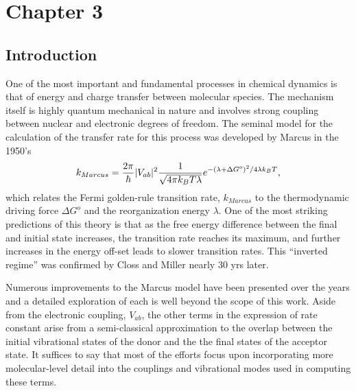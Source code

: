 \chapter{Chapter 3}

\section{Introduction}

One of the most important and fundamental processes in chemical  dynamics is
that of energy and charge transfer between molecular species.  The mechanism
itself is highly quantum mechanical in nature and involves strong coupling between nuclear and
electronic degrees of freedom.  The seminal model for the calculation of the transfer rate for this process
was developed by Marcus in the 1950's\cite{marcus1956theory,marcus1965theory,marcus1993electron}
\begin{equation}
k_{Marcus}=\frac{2\pi}{\hbar}|V_{ab}|^{2}\frac{1}{\sqrt{4\text{\ensuremath{\pi}}k_{B}T\lambda}}e^{-(\lambda+ \Delta G^{o})^{2}/4\text{\ensuremath{\lambda}}k_{B}T},
\end{equation}
which relates the Fermi golden-rule transition rate, $k_{Marcus}$
to the thermodynamic driving force $\Delta G^{o}$ and the reorganization energy $\lambda$.
One of the most striking predictions of this theory is that as the free energy difference between the final and initial state increases, the transition rate reaches its maximum,
and further increases in the energy off-set leads to slower transition rates.
This ``inverted regime''  was confirmed by Closs and Miller\cite{miller1984intramolecular,closs1988determination,closs1989connection}
nearly 30 yrs later.

Numerous improvements to the Marcus model have been presented over the years and
a detailed exploration of each is well beyond the scope of this work.
Aside from the electronic coupling, $V_{ab}$,  the other terms in the expression of rate constant arise from
a semi-classical approximation to the overlap between the initial vibrational states of the donor and the
the final  states of the acceptor state. It suffices to say that most of the
efforts focus upon incorporating more molecular-level detail into the couplings and vibrational modes
used in computing these terms.

